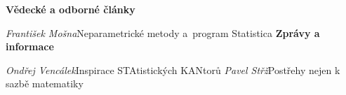 \textbf  {V\v edeck\'e a odborn\'e \v cl\'anky}\vspace  \smallskipamount \par 
\emph  {Franti\v sek Mo\v sna}\odskoc Neparametrick\'e metody a~program Statistica
\textbf  {Zpr\'avy a informace}\vspace  \smallskipamount \par 
\emph  {Ond\v rej Venc\'alek}\odskoc Inspirace STAtistick\'ych KANtor\r u
\emph  {Pavel St\v r\IeC {\'\i }\v z}\odskoc Post\v rehy nejen k sazb\v e matematiky
